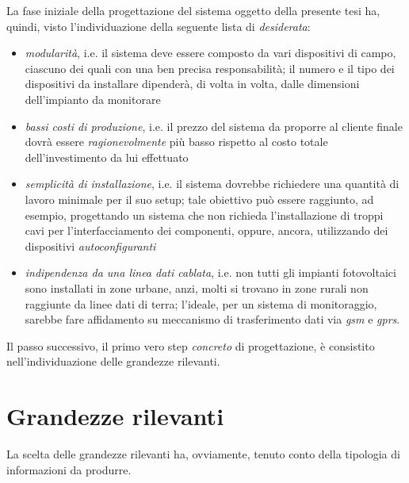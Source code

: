 %
La fase iniziale della progettazione del sistema oggetto della presente tesi
ha, quindi, visto l'individuazione della seguente lista di \emph{desiderata}:
%
\begin{itemize}
\item \emph{modularit\`a}, i.e. il sistema deve essere composto da vari dispositivi di 
      campo, ciascuno dei quali con una ben precisa responsabilit\`a; il numero e il 
      tipo dei dispositivi da installare dipender\`a, di volta in volta, dalle dimensioni 
      dell'impianto da monitorare
%
\item \emph{bassi costi di produzione}, i.e. il prezzo del sistema da proporre al cliente 
      finale dovr\`a essere \emph{ragionevolmente} pi\`u basso rispetto al costo totale 
      dell'investimento da lui effettuato
%
\item \emph{semplicit\`a di installazione}, i.e. il sistema dovrebbe richiedere una quantit\`a
      di lavoro minimale per il suo setup; tale obiettivo pu\`o essere raggiunto, ad esempio,  
      progettando un sistema che non richieda l'installazione di troppi cavi per 
      l'interfacciamento dei componenti, oppure, ancora, utilizzando dei dispositivi 
      \emph{autoconfiguranti}
%      
\item \emph{indipendenza da una linea dati cablata}, i.e. non tutti gli impianti fotovoltaici
      sono installati in zone urbane, anzi, molti si trovano in zone rurali non raggiunte da linee 
      dati di terra; l'ideale, per un sistema di monitoraggio, sarebbe fare affidamento
      su meccanismo di trasferimento dati via \emph{gsm} e \emph{gprs}.
%
\end{itemize}
%

%
Il passo successivo, il primo vero step \emph{concreto} di progettazione, \`e consistito 
nell'individuazione delle grandezze rilevanti.
%

%
\section{Grandezze rilevanti}
\label{sec:grandezze-rilevanti}
La scelta delle grandezze rilevanti ha, ovviamente, tenuto conto della tipologia di
informazioni da produrre. 
%

